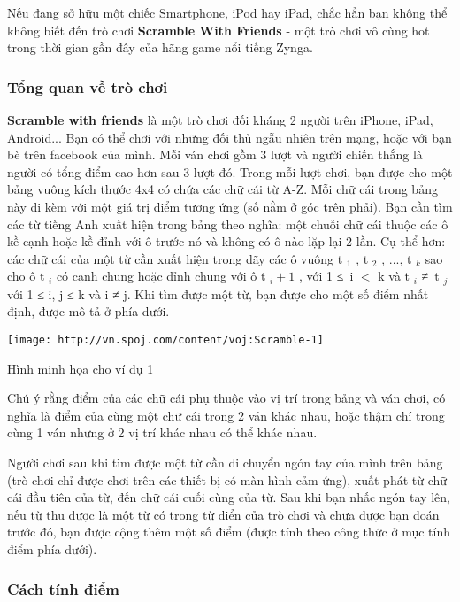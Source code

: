 

Nếu đang sở hữu một chiếc Smartphone, iPod hay iPad, chắc hẳn bạn không thể không biết đến trò chơi \textbf{ Scramble With Friends } - một trò chơi vô cùng hot trong thời gian gần đây của hãng game nổi tiếng Zynga.

\subsubsection{Tổng quan về trò chơi}

\textbf{Scramble with friends } là một trò chơi đối kháng 2 người trên iPhone, iPad, Android... Bạn có thể chơi với những đối thủ ngẫu nhiên trên mạng, hoặc với bạn bè trên facebook của mình. Mỗi ván chơi gồm 3 lượt và người chiến thắng là người có tổng điểm cao hơn sau 3 lượt đó. Trong mỗi lượt chơi, bạn được cho một bảng vuông kích thước 4x4 có chứa các chữ cái từ A-Z. Mỗi chữ cái trong bảng này đi kèm với một giá trị điểm tương ứng (số nằm ở góc trên phải). Bạn cần tìm các từ tiếng Anh xuất hiện trong bảng theo nghĩa: một chuỗi chữ cái thuộc các ô kề cạnh hoặc kề đỉnh với ô trước nó và không có ô nào lặp lại 2 lần. Cụ thể hơn: các chữ cái của một từ cần xuất hiện trong dãy các ô vuông t $_ 1 $ , t $_ 2 $ , ..., t $_ k $ sao cho ô t $_ i $ có cạnh chung hoặc đỉnh chung với ô t $_ i+1 $ , với 1 ≤ i $<$ k và t $_ i $ ≠ t $_ j $ với 1 ≤ i, j ≤ k và i ≠ j. Khi tìm được một từ, bạn được cho một số điểm nhất định, được mô tả ở phía dưới.


\texttt{[image: http://vn.spoj.com/content/voj:Scramble-1]}

Hình minh họa cho ví dụ 1

Chú ý rằng điểm của các chữ cái phụ thuộc vào vị trí trong bảng và ván chơi, có nghĩa là điểm của cùng một chữ cái trong 2 ván khác nhau, hoặc thậm chí trong cùng 1 ván nhưng ở 2 vị trí khác nhau có thể khác nhau.

Người chơi sau khi tìm được một từ cần di chuyển ngón tay của mình trên bảng (trò chơi chỉ được chơi trên các thiết bị có màn hình cảm ứng), xuất phát từ chữ cái đầu tiên của từ, đến chữ cái cuối cùng của từ. Sau khi bạn nhấc ngón tay lên, nếu từ thu được là một từ có trong từ điển của trò chơi và chưa được bạn đoán trước đó, bạn được cộng thêm một số điểm (được tính theo công thức ở mục tính điểm phía dưới).

\subsubsection{Cách tính điểm}

